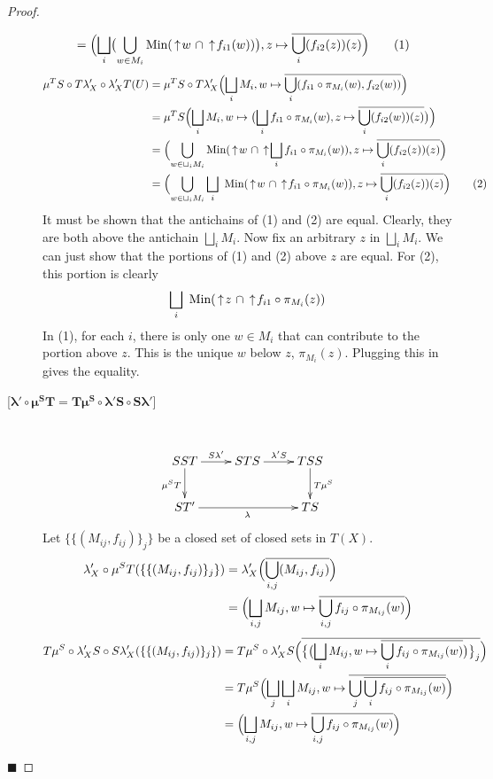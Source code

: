 \begin{proof}
\begin{description}
\begin{align*}
&= \Bigl(\bigsqcup_i\bigl(\bigcup_{w\in M_i} \textrm{Min}(\,\uparrow\! w\ \cap \,\uparrow\! f_{i1}(w))\bigr), z\mapsto\overline{\bigcup_i (f_{i2}(z))(z)}\Bigr) \tag{1}
\end{align*}
\begin{align*}
\mu^T S\circ T\lambda'_X\circ\lambda'_X T (U) &= \mu^T S\circ T\lambda'_X\Bigl(\bigsqcup_i M_i,w\mapsto\overline{ \bigcup_i (f_{i1}\circ\pi_{M_i}(w), f_{i2}(w))}\Bigr) \\
&= \mu^T S \Bigl(\bigsqcup_i M_i, w\mapsto\bigl(\bigsqcup_i  f_{i1}\circ\pi_{M_i}(w), z\mapsto \overline{ \bigcup_i(f_{i2}(w))(z)}\bigr)\Bigr) \\
&= \Bigl(\bigcup_{w\in \sqcup_i M_i} \textrm{Min}(\,\uparrow\! w\ \cap \,\uparrow\! \bigsqcup_i  f_{i1}\circ\pi_{M_i}(w)), z\mapsto\overline{\bigcup_i (f_{i2}(z))(z)}\Bigr) \\
&= \Bigl(\bigcup_{w\in \sqcup_i M_i} \bigsqcup_i\ \textrm{Min}(\,\uparrow\! w\ \cap \,\uparrow\! f_{i1}\circ\pi_{M_i}(w)), z\mapsto\overline{\bigcup_i (f_{i2}(z))(z)}\Bigr) \tag{2}
\end{align*}
It must be shown that the antichains of (1) and (2) are equal.  Clearly, they are both above the antichain $\bigsqcup_i M_i$.  Now fix an arbitrary $z$ in $\bigsqcup_i M_i$.  We can just show that the portions of (1) and (2) above $z$ are equal.  For (2), this portion is clearly
\[\bigsqcup_i\ \textrm{Min}(\,\uparrow\! z\ \cap \,\uparrow\! f_{i1}\circ\pi_{M_i}(z))\]
In (1), for each $i$, there is only one $w\in M_i$ that can contribute to the portion above $z$.  This is the unique $w$ below $z$, $\pi_{M_i}(z)$.  Plugging this in gives the equality.
\item[{[}$\boldsymbol{\lambda'\circ\mu^S T = T\mu^S\circ \lambda' S\circ S\lambda'}${]}] \hfill \\
\[
\xymatrix{
SST\ar[r]^{S\lambda'}\ar[d]_{\mu^S T} & STS\ar[r]^{\lambda' S} & TSS\ar[d]^{T\mu^S} \\
ST\ar[rr]_\lambda' & & TS
}
\]
Let $\{\{(M_{ij},f_{ij})\}_j\}$ be a closed set of closed sets in $T(X)$.
\begin{align*}
\lambda'_X\circ\mu^S T (\{\{(M_{ij},f_{ij})\}_j\}) &= \lambda'_X\Bigl(\overline{ \bigcup_{i,j}(M_{ij},f_{ij}) }\Bigr) \\
&= \Bigl(\bigsqcup_{i,j} M_{ij}, w\mapsto\overline{\bigcup_{i,j} f_{ij}\circ \pi_{M_{ij}}(w)}\Bigr)
\end{align*}
\begin{align*}
T\mu^S\circ \lambda'_X S\circ S\lambda'_X (\{\{(M_{ij},f_{ij})\}_j\}) &= T\mu^S\circ \lambda'_X S \Bigl(\overline{\bigl\{\bigl(\bigsqcup_i M_{ij},w\mapsto\overline{ \bigcup_i f_{ij}\circ \pi_{M_{ij}}(w)}\bigr)\bigr\}_j}\Bigr) \\
&= T\mu^S \Bigl(\bigsqcup_j \bigsqcup_i M_{ij}, w\mapsto\overline{ \bigcup_j\overline{\bigcup_i f_{ij}\circ \pi_{M_{ij}}(w)}}\Bigr) \\
&= \Bigl(\bigsqcup_{i,j} M_{ij}, w\mapsto\overline{\bigcup_{i,j} f_{ij}\circ \pi_{M_{ij}}(w)}\Bigr)
\end{align*}
\end{description} \hfill $\blacksquare$
\end{proof}

